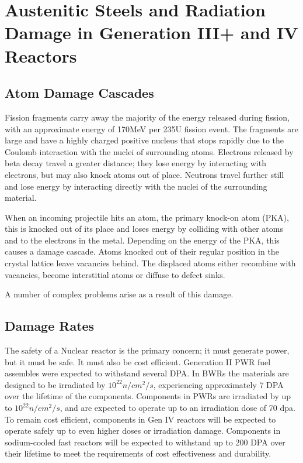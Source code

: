 \section{Austenitic Steels and Radiation Damage in Generation III+ and IV Reactors}

\subsection{Atom Damage Cascades}

Fission fragments carry away the majority of the energy released during fission, with an approximate energy of 170MeV per 235U fission event.  The fragments are large and have a highly charged positive nucleus that stops rapidly due to the Coulomb interaction with the nuclei of surrounding atoms.  Electrons released by beta decay travel a greater distance; they lose energy by interacting with electrons, but may also knock atoms out of place.  Neutrons travel further still and lose energy by interacting directly with the nuclei of the surrounding material.

When an incoming projectile hits an atom, the primary knock-on atom (PKA), this is knocked out of its place and loses energy by colliding with other atoms and to the electrons in the metal.  Depending on the energy of the PKA, this causes a damage cascade.  Atoms knocked out of their regular position in the crystal lattice leave vacancies behind.  The displaced atoms either recombine with vacancies, become interstitial atoms or diffuse to defect sinks.

A number of complex problems arise as a result of this damage.


\subsection{Damage Rates}

The safety of a Nuclear reactor is the primary concern; it must generate power, but it must be safe.  It must also be cost efficient.  Generation II PWR fuel assembles were expected to withstand several DPA\cite{genIVstrucmat}.  In BWRs the materials are designed to be irradiated by $10^22 n/cm^2/s$, experiencing approximately 7 DPA over the lifetime of the components\cite{lightwaterallenbusby}.  Components in PWRs are irradiated by up to $10^22 n/cm^2/s$, and are expected to operate up to an irradiation dose of 70 dpa\cite{lightwaterallenbusby}.  To remain cost efficient, components in Gen IV reactors will be expected to operate safely up to even higher doses or irradiation damage.  Components in sodium-cooled fast reactors will be expected to withstand up to 200 DPA over their lifetime to meet the requirements of cost effectiveness and durability\cite{genIVstrucmat}.

